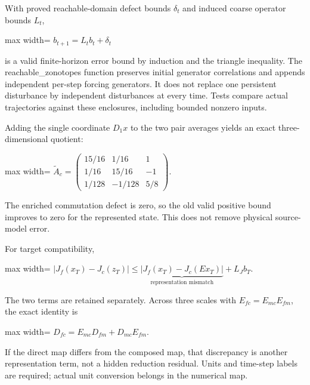 \documentclass[
  11pt,
  a4paper,
]{report}
\begin{document}
With proved reachable-domain defect bounds \(\delta_t\) and induced
coarse operator bounds \(L_t\), \begin{center}
\begin{adjustbox}{max width=\linewidth}
$\displaystyle
b_{t+1}=L_tb_t+\delta_t
$
\end{adjustbox}
\end{center} is a valid finite-horizon error bound by induction and the triangle
inequality. The reachable\_zonotopes function preserves initial
generator correlations and appends independent per-step forcing
generators. It does not replace one persistent disturbance by
independent disturbances at every time. Tests compare actual
trajectories against these enclosures, including bounded nonzero inputs.

Adding the single coordinate \(D_1x\) to the two pair averages yields an
exact three-dimensional quotient: \begin{center}
\begin{adjustbox}{max width=\linewidth}
$\displaystyle
\widetilde A_c=
\begin{pmatrix}
15/16&1/16&1\\
1/16&15/16&-1\\
1/128&-1/128&5/8
\end{pmatrix}.
$
\end{adjustbox}
\end{center} The enriched commutation defect is zero, so the old valid positive
bound improves to zero for the represented state. This does not remove
physical source-model error.

For target compatibility, \begin{center}
\begin{adjustbox}{max width=\linewidth}
$\displaystyle
|J_f(x_T)-J_c(z_T)|
\le \underbrace{|J_f(x_T)-J_c(Ex_T)|}_{\text{representation mismatch}}
+L_Jb_T.
$
\end{adjustbox}
\end{center} The two terms are retained separately. Across three scales with
\(E_{fc}=E_{mc}E_{fm}\), the exact identity is \begin{center}
\begin{adjustbox}{max width=\linewidth}
$\displaystyle
D_{fc}=E_{mc}D_{fm}+D_{mc}E_{fm}.
$
\end{adjustbox}
\end{center} If the direct map differs from the composed map, that discrepancy is
another representation term, not a hidden reduction residual. Units and
time-step labels are required; actual unit conversion belongs in the
numerical map.
\end{document}
